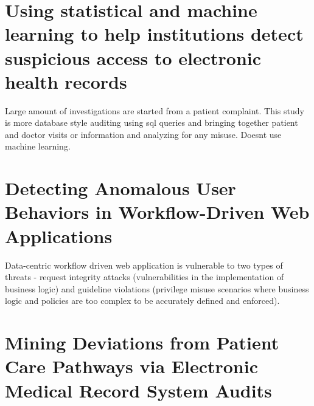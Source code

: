\documentclass[12pt]{article}
\begin{document}
\section{Using statistical and machine learning to help institutions detect suspicious access to electronic health records}
Large amount of investigations are started from a patient complaint.  \cite{Fabbri:2011:EA:2047485.2047486} 
This study is more database style auditing using sql queries and bringing together patient and doctor visits or information and analyzing for any misuse. Doesnt use machine learning. 

\section{Detecting Anomalous User Behaviors in Workflow-Driven Web Applications}
Data-centric workflow driven web application is vulnerable to two types of threats - request integrity attacks (vulnerabilities in the implementation of business logic) and guideline violations (privilege misuse scenarios where business logic and policies are too complex to be accurately defined and enforced). \cite{6424834}

\section{Mining Deviations from Patient Care Pathways via Electronic Medical Record System Audits}
\cite{Zhang:2013:MDP:2555810.2544102}

\footnotesize

\end{document}
